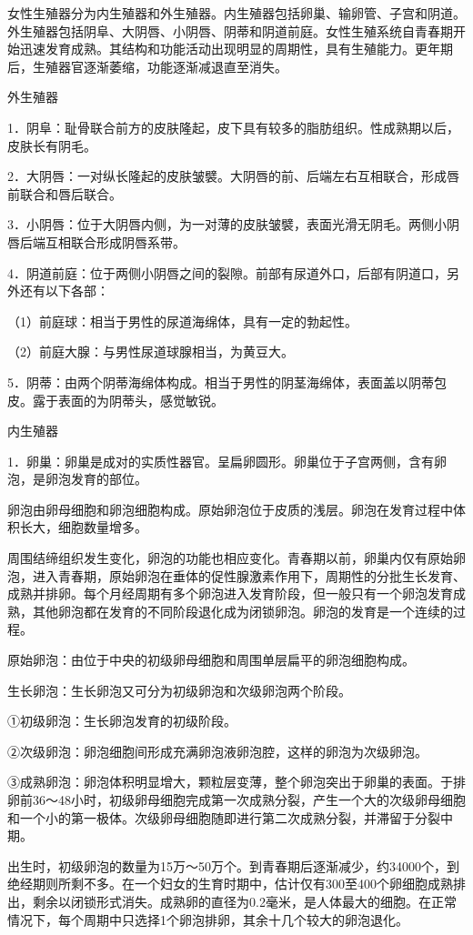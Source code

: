 \documentclass[12pt,UTF8]{ctexbook}
\begin{document}
女性生殖器分为内生殖器和外生殖器。内生殖器包括卵巢、输卵管、子宫和阴道。外生殖器包括阴阜、大阴唇、小阴唇、阴蒂和阴道前庭。女性生殖系统自青春期开始迅速发育成熟。其结构和功能活动出现明显的周期性，具有生殖能力。更年期后，生殖器官逐渐萎缩，功能逐渐减退直至消失。

外生殖器

1．阴阜：耻骨联合前方的皮肤隆起，皮下具有较多的脂肪组织。性成熟期以后，皮肤长有阴毛。

2．大阴唇：一对纵长隆起的皮肤皱襞。大阴唇的前、后端左右互相联合，形成唇前联合和唇后联合。

3．小阴唇：位于大阴唇内侧，为一对薄的皮肤皱襞，表面光滑无阴毛。两侧小阴唇后端互相联合形成阴唇系带。

4．阴道前庭：位于两侧小阴唇之间的裂隙。前部有尿道外口，后部有阴道口，另外还有以下各部：

（1）前庭球：相当于男性的尿道海绵体，具有一定的勃起性。

（2）前庭大腺：与男性尿道球腺相当，为黄豆大。

5．阴蒂：由两个阴蒂海绵体构成。相当于男性的阴茎海绵体，表面盖以阴蒂包皮。露于表面的为阴蒂头，感觉敏锐。

内生殖器

1．卵巢：卵巢是成对的实质性器官。呈扁卵圆形。卵巢位于子宫两侧，含有卵泡，是卵泡发育的部位。

卵泡由卵母细胞和卵泡细胞构成。原始卵泡位于皮质的浅层。卵泡在发育过程中体积长大，细胞数量增多。

周围结缔组织发生变化，卵泡的功能也相应变化。青春期以前，卵巢内仅有原始卵泡，进入青春期，原始卵泡在垂体的促性腺激素作用下，周期性的分批生长发育、成熟并排卵。每个月经周期有多个卵泡进入发育阶段，但一般只有一个卵泡发育成熟，其他卵泡都在发育的不同阶段退化成为闭锁卵泡。卵泡的发育是一个连续的过程。

原始卵泡：由位于中央的初级卵母细胞和周围单层扁平的卵泡细胞构成。

生长卵泡：生长卵泡又可分为初级卵泡和次级卵泡两个阶段。

①初级卵泡：生长卵泡发育的初级阶段。

②次级卵泡：卵泡细胞间形成充满卵泡液卵泡腔，这样的卵泡为次级卵泡。

③成熟卵泡：卵泡体积明显增大，颗粒层变薄，整个卵泡突出于卵巢的表面。于排卵前36～48小时，初级卵母细胞完成第一次成熟分裂，产生一个大的次级卵母细胞和一个小的第一极体。次级卵母细胞随即进行第二次成熟分裂，并滞留于分裂中期。

出生时，初级卵泡的数量为15万～50万个。到青春期后逐渐减少，约34000个，到绝经期则所剩不多。在一个妇女的生育时期中，估计仅有300至400个卵细胞成熟排出，剩余以闭锁形式消失。成熟卵的直径为0.2毫米，是人体最大的细胞。在正常情况下，每个周期中只选择1个卵泡排卵，其余十几个较大的卵泡退化。
\end{document}
